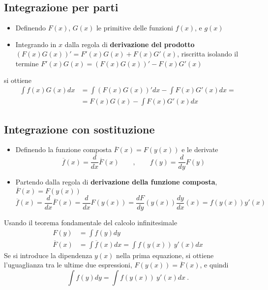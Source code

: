 \subsection{Integrazione per parti}
\begin{itemize}
 \item Definendo $F(x)$, $G(x)$ le primitive delle funzioni $f(x)$, e $g(x)$
 \item Integrando in $x$ dalla regola di \textbf{derivazione del prodotto} $(F(x)G(x))' = F'(x)G(x) + F(x)G'(x)$, riscritta isolando il termine $F'(x)G(x) = (F(x)G(x))' - F(x)G'(x)$
\end{itemize}
si ottiene
\begin{equation}
\begin{aligned}
    \int f(x) G(x) dx & = \int (F(x) G(x))' dx - \int F(x) G'(x) dx = \\
    &= F(x)G(x) - \int F(x) G'(x) dx 
\end{aligned}
\end{equation}

\subsection{Integrazione con sostituzione}
\begin{itemize}
    \item Definendo la funzione composta $\overline{F}(x) = F(y(x))$ e le derivate
        \begin{equation}
            \overline{f}(x) = \dfrac{d}{dx} \overline{F}(x) \qquad , \qquad f(y) = \dfrac{d}{dy}F(y)
        \end{equation}
    \item Partendo dalla regola di \textbf{derivazione della funzione composta}, $\overline{F}(x) = F(y(x))$
        \begin{equation}
            \overline{f}(x) = \dfrac{d}{dx} \overline{F}(x) = \dfrac{d}{dx} F(y(x)) = \dfrac{d F}{dy}(y(x)) \dfrac{d y}{d x}(x) = f(y(x)) y'(x)
        \end{equation}
\end{itemize}
Usando il teorema fondamentale del calcolo infinitesimale
\begin{equation}
\begin{aligned}
    F(y) & = \int f(y) dy \\
    \overline{F}(x) & = \int \overline{f}(x) dx = \int f(y(x)) \ y'(x) dx
\end{aligned}
\end{equation}
Se si introduce la dipendenza $y(x)$ nella prima equazione, si ottiene l'uguaglianza tra le ultime due espressioni, $F(y(x)) = \overline{F}(x)$, e quindi
\begin{equation}
  \int f(y) dy = \int f(y(x)) \ y'(x) dx \ .
\end{equation}
